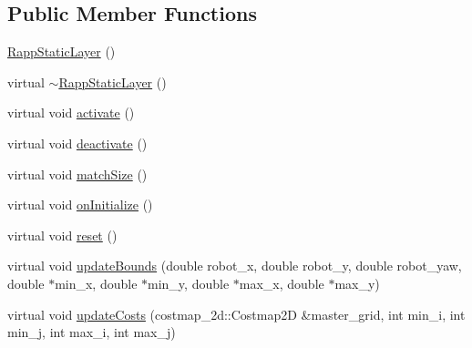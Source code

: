 \subsection*{Public Member Functions}
\begin{DoxyCompactItemize}
\item 
\hyperlink{classcostmap__2d_1_1RappStaticLayer_aafc8750e4a6cdecfd2208c3cbef1b9e3}{Rapp\-Static\-Layer} ()
\item 
virtual \hyperlink{classcostmap__2d_1_1RappStaticLayer_ab550b41686e2d7918f8029dd20908aac}{$\sim$\-Rapp\-Static\-Layer} ()
\item 
virtual void \hyperlink{classcostmap__2d_1_1RappStaticLayer_a8c8a2d49cb525cb861c1cfdd6d5a89b1}{activate} ()
\item 
virtual void \hyperlink{classcostmap__2d_1_1RappStaticLayer_ac78bf4bd8fa9123b57466d171e6b76e5}{deactivate} ()
\item 
virtual void \hyperlink{classcostmap__2d_1_1RappStaticLayer_a3c3628d218ccea099becefc62ae8df11}{match\-Size} ()
\item 
virtual void \hyperlink{classcostmap__2d_1_1RappStaticLayer_ab35c59f69929e82416894cc07e2d1614}{on\-Initialize} ()
\item 
virtual void \hyperlink{classcostmap__2d_1_1RappStaticLayer_abfe970c32df0436d4e8fddb5f4eb5809}{reset} ()
\item 
virtual void \hyperlink{classcostmap__2d_1_1RappStaticLayer_aa77b0cbf7d9ef125dbcfa945e4b47228}{update\-Bounds} (double robot\-\_\-x, double robot\-\_\-y, double robot\-\_\-yaw, double $\ast$min\-\_\-x, double $\ast$min\-\_\-y, double $\ast$max\-\_\-x, double $\ast$max\-\_\-y)
\item 
virtual void \hyperlink{classcostmap__2d_1_1RappStaticLayer_ae072d082fab3e885667ef88321ecf7a1}{update\-Costs} (costmap\-\_\-2d\-::\-Costmap2\-D \&master\-\_\-grid, int min\-\_\-i, int min\-\_\-j, int max\-\_\-i, int max\-\_\-j)
\end{DoxyCompactItemize}
